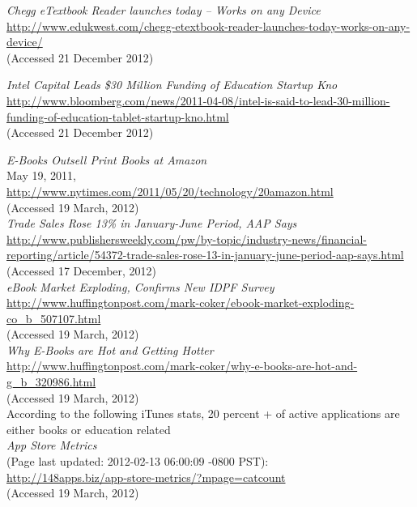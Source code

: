 \documentclass[a4paper,10pt]{book}
\begin{document}
\begin{thebibliography}{9}
   \emph{Chegg eTextbook Reader launches today – Works on any Device}\\
   \url{http://www.edukwest.com/chegg-etextbook-reader-launches-today-works-on-any-device/}\\
 (Accessed 21 December 2012)
 
   \emph{Intel Capital Leads \$30 Million Funding of Education Startup Kno}\\
   \url{http://www.bloomberg.com/news/2011-04-08/intel-is-said-to-lead-30-million-funding-of-education-tablet-startup-kno.html}\\
  (Accessed 21 December 2012)
   
  \emph{E-Books Outsell Print Books at Amazon}\\ 
  May 19, 2011,\\
  \url{http://www.nytimes.com/2011/05/20/technology/20amazon.html}\\
  (Accessed 19 March, 2012)\\

   \emph{Trade Sales Rose 13\% in January-June Period, AAP Says } \\
  \url{http://www.publishersweekly.com/pw/by-topic/industry-news/financial-reporting/article/54372-trade-sales-rose-13-in-january-june-period-aap-says.html}\\
  (Accessed 17 December, 2012)\\
  

   \emph{eBook Market Exploding, Confirms New IDPF Survey}\\
   \url{http://www.huffingtonpost.com/mark-coker/ebook-market-exploding-co_b_507107.html}\\
  (Accessed 19 March, 2012)\\

   \emph{Why E-Books are Hot and Getting Hotter}\\
  \url{http://www.huffingtonpost.com/mark-coker/why-e-books-are-hot-and-g_b_320986.html}\\
 (Accessed 19 March, 2012)\\

   According to the following iTunes stats, 20 percent + of active applications are either books or education related \\
   \emph{App Store Metrics}\\
   (Page last updated: 2012-02-13 06:00:09 -0800 PST): \\
   \url{http://148apps.biz/app-store-metrics/?mpage=catcount} \\
  (Accessed 19 March, 2012)\\
 

\end{thebibliography}
\end{document}
